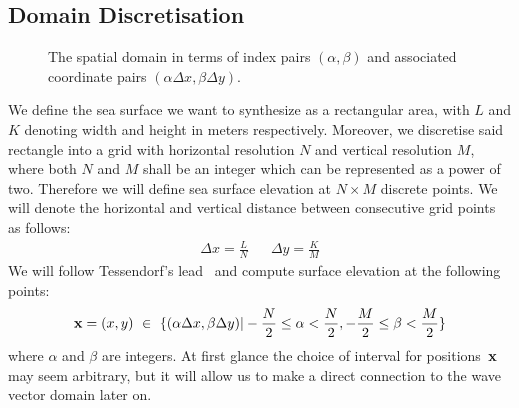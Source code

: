 \subsection{Domain Discretisation}
\label{sec:domain_discretisation}
%
\begin{figure}
\centering
{}
\caption{The spatial domain in terms of index pairs $(\alpha,\beta)$ and
associated coordinate pairs $(\alpha\Delta x,\beta\Delta y)$.}
\label{fig:spatial_domain}
\end{figure}
%
We define the sea surface we want to synthesize as a rectangular area, with $L$
and $K$ denoting width and height in meters respectively. Moreover, we
discretise said rectangle into a grid with horizontal resolution $N$ and
vertical resolution $M$, where both $N$ and $M$ shall be an integer which can
be represented as a power of two. Therefore we will define sea surface elevation 
at $N\times M$ discrete points. We will denote the horizontal and vertical
distance between consecutive grid points as follows:
\begin{align}
 \Delta x = \frac{L}{N} && \Delta y = \frac{K}{M}
\end{align}
We will follow Tessendorf's lead~\cite{course:simulatingocean} and compute
surface elevation at the following points:
\begin{equation}
\label{eq:spatial_domain}
 \mathbf{x} = (x,y)~\in~\{(\alpha\Delta x,\beta\Delta y)|
-\frac{N}{2}\leq\alpha<\frac{N}{2},-\frac{M}{2}\leq\beta<\frac{M}{2}\}
\end{equation}
where $\alpha$ and $\beta$ are integers. At first glance the choice of interval
for positions~$\mathbf{x}$ may seem arbitrary, but it will allow us to make a
direct connection to the wave vector domain later on.\\

